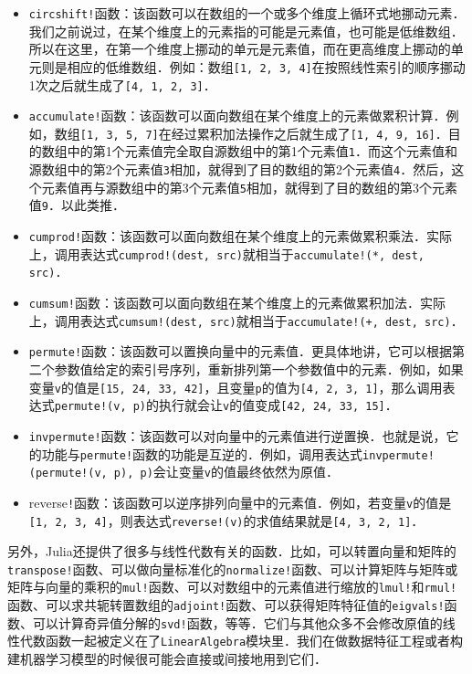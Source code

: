 \begin{itemize}
\item \verb|circshift!|函数：该函数可以在数组的一个或多个维度上循环式地挪动元素．我们之前说过，在某个维度上的元素指的可能是元素值，也可能是低维数组．所以在这里，在第一个维度上挪动的单元是元素值，而在更高维度上挪动的单元则是相应的低维数组．例如：数组\verb|[1, 2, 3, 4]|在按照线性索引的顺序挪动1次之后就生成了\verb|[4, 1, 2, 3]|．
\item \verb|accumulate!|函数：该函数可以面向数组在某个维度上的元素做累积计算．例如，数组\verb|[1, 3, 5, 7]|在经过累积加法操作之后就生成了\verb|[1, 4, 9, 16]|．目的数组中的第1个元素值完全取自源数组中的第1个元素值\verb|1|．而这个元素值和源数组中的第2个元素值\verb|3|相加，就得到了目的数组的第2个元素值\verb|4|．然后，这个元素值再与源数组中的第3个元素值\verb|5|相加，就得到了目的数组的第3个元素值\verb|9|．以此类推．
\item  \verb|cumprod!|函数：该函数可以面向数组在某个维度上的元素做累积乘法．实际上，调用表达式\verb|cumprod!(dest, src)|就相当于\verb|accumulate!(*, dest, src)|．
\item \verb|cumsum!|函数：该函数可以面向数组在某个维度上的元素做累积加法．实际上，调用表达式\verb|cumsum!(dest, src)|就相当于\verb|accumulate!(+, dest, src)|．
\item \verb|permute!|函数：该函数可以置换向量中的元素值．更具体地讲，它可以根据第二个参数值给定的索引号序列，重新排列第一个参数值中的元素．例如，如果变量\verb|v|的值是\verb|[15, 24, 33, 42]|，且变量\verb|p|的值为\verb|[4, 2, 3, 1]|，那么调用表达式\verb|permute!(v, p)|的执行就会让\verb|v|的值变成\verb|[42, 24, 33, 15]|．
\item \verb|invpermute!|函数：该函数可以对向量中的元素值进行逆置换．也就是说，它的功能与\verb|permute!|函数的功能是互逆的．例如，调用表达式\verb|invpermute!(permute!(v, p), p)|会让变量\verb|v|的值最终依然为原值．
\item reverse\verb|!|函数：该函数可以逆序排列向量中的元素值．例如，若变量\verb|v|的值是\verb|[1, 2, 3, 4]|，则表达式\verb|reverse!(v)|的求值结果就是\verb|[4, 3, 2, 1]|．
\end{itemize}

另外，Julia还提供了很多与线性代数有关的函数．比如，可以转置向量和矩阵的\verb|transpose!|函数、可以做向量标准化的\verb|normalize!|函数、可以计算矩阵与矩阵或矩阵与向量的乘积的\verb|mul!|函数、可以对数组中的元素值进行缩放的\verb|lmul!|和\verb|rmul!|函数、可以求共轭转置数组的\verb|adjoint!|函数、可以获得矩阵特征值的\verb|eigvals!|函数、可以计算奇异值分解的\verb|svd!|函数，等等．它们与其他众多不会修改原值的线性代数函数一起被定义在了\verb|LinearAlgebra|模块里．我们在做数据特征工程或者构建机器学习模型的时候很可能会直接或间接地用到它们．